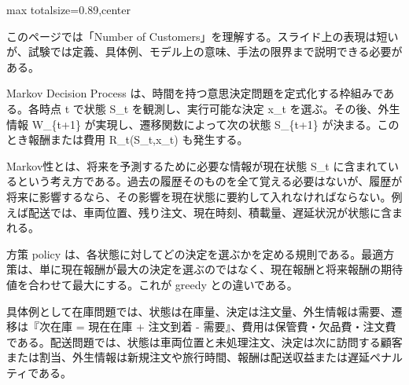 \begin{minipage}[t]{0.58\textwidth}
\begin{adjustbox}{max totalsize={\textwidth}{0.89\textheight},center}
\begin{minipage}{\textwidth}\scriptsize
{}このページでは「Number of Customers」を理解する。スライド上の表現は短いが、試験では定義、具体例、モデル上の意味、手法の限界まで説明できる必要がある。\par
Markov Decision Process は、時間を持つ意思決定問題を定式化する枠組みである。各時点 t で状態 S\_t を観測し、実行可能な決定 x\_t を選ぶ。その後、外生情報 W\_\{t+1\} が実現し、遷移関数によって次の状態 S\_\{t+1\} が決まる。このとき報酬または費用 R\_t(S\_t,x\_t) も発生する。\par
Markov性とは、将来を予測するために必要な情報が現在状態 S\_t に含まれているという考え方である。過去の履歴そのものを全て覚える必要はないが、履歴が将来に影響するなら、その影響を現在状態に要約して入れなければならない。例えば配送では、車両位置、残り注文、現在時刻、積載量、遅延状況が状態に含まれる。\par
方策 policy は、各状態に対してどの決定を選ぶかを定める規則である。最適方策は、単に現在報酬が最大の決定を選ぶのではなく、現在報酬と将来報酬の期待値を合わせて最大にする。これが greedy との違いである。\par
具体例として在庫問題では、状態は在庫量、決定は注文量、外生情報は需要、遷移は『次在庫 = 現在在庫 + 注文到着 - 需要』、費用は保管費・欠品費・注文費である。配送問題では、状態は車両位置と未処理注文、決定は次に訪問する顧客または割当、外生情報は新規注文や旅行時間、報酬は配送収益または遅延ペナルティである。\par

\end{minipage}
\end{adjustbox}
\end{minipage}
